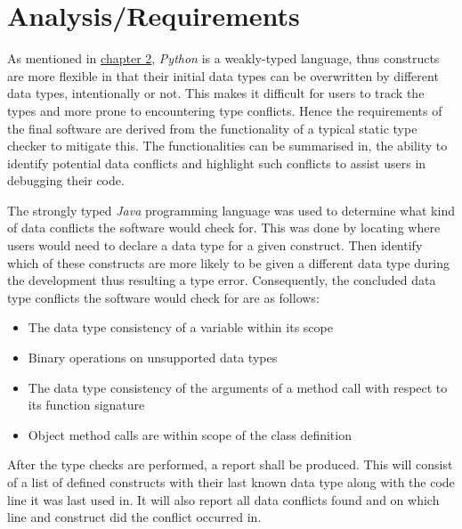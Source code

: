 \documentclass{l4proj}
\begin{document}
\chapter{Analysis/Requirements}

As mentioned in \hyperref[sec: what type checker]{chapter 2}, \emph{Python} is a weakly-typed language, thus constructs are more flexible in that their initial data types can be overwritten by different data types, intentionally or not. This makes it difficult for users to track the types and more prone to encountering type conflicts. Hence the requirements of the final software are derived from the functionality of a typical static type checker to mitigate this. The functionalities can be summarised in, the ability to identify potential data conflicts and highlight such conflicts to assist users in debugging their code.

The strongly typed \emph{Java} programming language was used to determine what kind of data conflicts the software would check for. This was done by locating where users would need to declare a data type for a given construct. Then identify which of these constructs are more likely to be given a different data type during the development thus resulting a type error. Consequently, the concluded data type conflicts the software would check for are as follows:

\begin{itemize}
    \item The data type consistency of a variable within its scope
    \item Binary operations on unsupported data types
    \item The data type consistency of the arguments of a method call with respect to its function signature 
    \item Object method calls are within scope of the class definition
\end{itemize}

After the type checks are performed, a report shall be produced. This will consist of a list of defined constructs with their last known data type along with the code line it was last used in. It will also report all data conflicts found and on which line and construct did the conflict occurred in.
\end{document}
